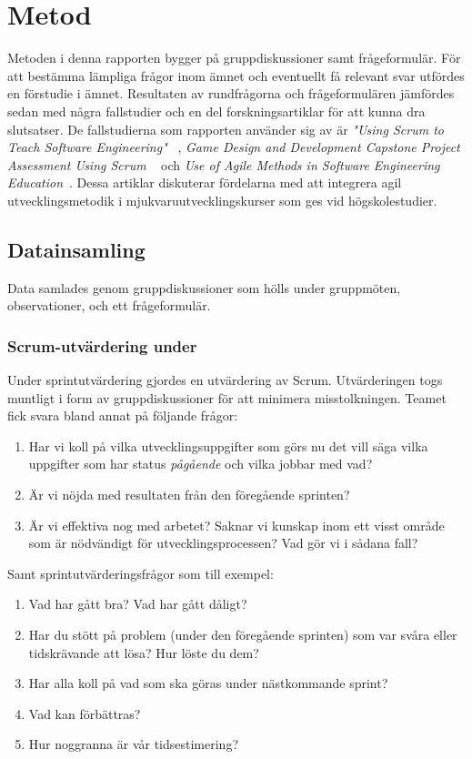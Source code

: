 \section{Metod} \label{sec:Lieth_Wahid-method}
Metoden i denna rapporten bygger på gruppdiskussioner samt frågeformulär. För att bestämma lämpliga frågor inom ämnet och eventuellt  få relevant svar utfördes en förstudie i ämnet. Resultaten av rundfrågorna och frågeformulären jämfördes sedan med några  fallstudier och en del forskningsartiklar för att kunna dra slutsatser. De fallstudierna som rapporten använder sig av är \textit{"Using Scrum to Teach Software Engineering"} ~\cite{Usingscr27:online}, \textit{ Game Design and Development Capstone Project Assessment Using Scrum} ~\cite{GameDesign} och \textit{Use of Agile Methods in Software Engineering Education}~\cite{UseofAgi59:online}. Dessa artiklar diskuterar fördelarna med att integrera agil utvecklingsmetodik i mjukvaruutvecklingskurser som ges vid högskolestudier.  
\subsection{Datainsamling}\label{ds}
Data samlades genom gruppdiskussioner som hölls under gruppmöten, observationer, och ett frågeformulär. 
\subsubsection {Scrum-utvärdering under } \label{Lieth:scrumU}
Under sprintutvärdering gjordes en utvärdering av Scrum. Utvärderingen togs muntligt i form av gruppdiskussioner för att minimera misstolkningen. Teamet fick svara bland annat på följande frågor:
\begin{enumerate}
	\item Har vi koll på vilka utvecklingsuppgifter som görs nu det vill säga vilka uppgifter som har status \textit{pågående} och vilka jobbar med vad? 
	\item Är vi nöjda med resultaten från den föregående sprinten?
	\item Är vi effektiva nog med arbetet? Saknar vi kunskap inom ett visst område som är nödvändigt för utvecklingsprocessen? Vad gör vi i sådana fall? \label{f3}
\end{enumerate} 
Samt sprintutvärderingsfrågor som till exempel:
\begin{enumerate}
	\item Vad har gått bra? Vad har gått dåligt?
	\item Har du stött på problem (under den föregående sprinten) som var svåra eller tidskrävande att lösa? Hur löste du dem?
	\item Har alla koll på vad som ska göras under nästkommande sprint?
	\item Vad kan förbättras?
	\item Hur noggranna är vår tidsestimering?
\end{enumerate} 


